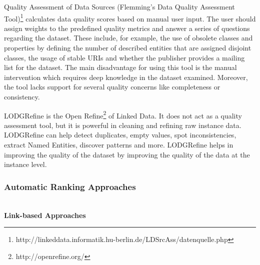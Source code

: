 \documentclass[onecolumn, crcready]{iosart2c}
\begin{document}
Quality Assessment of Data Sources (Flemming's Data Quality Assessment Tool)\footnote{http://linkeddata.informatik.hu-berlin.de/LDSrcAss/datenquelle.php} calculates data quality scores based on manual user input. The user should assign weights to the predefined quality metrics and answer a series of questions regarding the dataset. These include, for example, the use of obsolete classes and properties by defining the number of described entities that are assigned disjoint classes, the usage of stable URIs and whether the publisher provides a mailing list for the dataset. The main disadvantage for using this tool is the manual intervention which requires deep knowledge in the dataset examined. Moreover, the tool lacks support for several quality concerns like completeness or consistency.

LODGRefine \cite{conf/i-semantics/Verlic12} is the Open Refine\footnote{http://openrefine.org/} of Linked Data. It does not act as a quality assessment tool, but it is powerful in cleaning and refining raw instance data. LODGRefine can help detect duplicates, empty values, spot inconsistencies, extract Named Entities, discover patterns and more. LODGRefine helps in improving the quality of the dataset by improving the quality of the data at the instance level.\\

\subsubsection{Automatic Ranking Approaches}

\indent \\{\bf Link-based Approaches}
\end{document}

